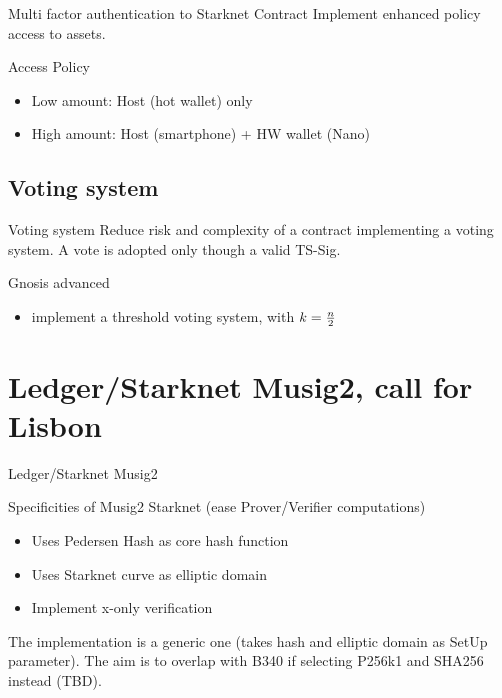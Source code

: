 \documentclass[aspectratio=43]{beamer}
\begin{document}
\begin{frame}{Multi factor authentication to Starknet Contract}
Implement enhanced policy access to assets.

\begin{exampleblock}{Access Policy}
\begin{itemize}
\item Low amount: Host (hot wallet) only
\item High amount: Host (smartphone) + HW wallet (Nano) 
\end{itemize}
\end{exampleblock}


\end{frame} 

\subsection{Voting system}

\begin{frame}{Voting system}
Reduce risk and complexity of a contract implementing a voting system.
A vote is adopted only though a valid TS-Sig.

\begin{exampleblock}{Gnosis advanced}
\begin{itemize}
\item implement a threshold voting system, with $k={n\over 2}$
\end{itemize}
\end{exampleblock}


\end{frame} 

\section{Ledger/Starknet Musig2, call for Lisbon}



\begin{frame}{Ledger/Starknet Musig2}

Specificities of Musig2 Starknet (ease Prover/Verifier computations)
\begin{itemize}
\item Uses Pedersen Hash as core hash function 
\item Uses Starknet curve as elliptic domain
\item Implement x-only verification
\end{itemize} 
The implementation is a generic one (takes hash and elliptic domain as SetUp parameter).
The aim is to overlap with B340 if selecting P256k1 and SHA256 instead (TBD).     
     
\end{frame}
\end{document}
